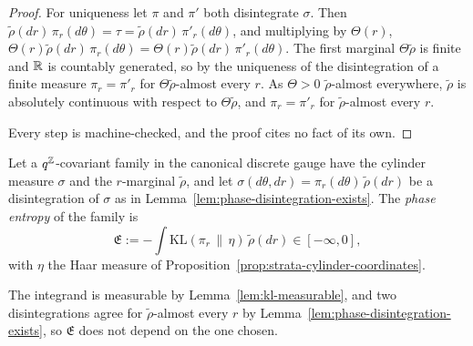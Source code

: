 \begin{proof}
For uniqueness let $\pi$ and $\pi'$ both disintegrate $\sigma$. Then
$\tilde\rho(dr)\,\pi_r(d\theta) = \tau = \tilde\rho(dr)\,\pi'_r(d\theta)$, and multiplying by $\Theta(r)$,
$\Theta(r)\tilde\rho(dr)\,\pi_r(d\theta) = \Theta(r)\tilde\rho(dr)\,\pi'_r(d\theta)$. The first marginal
$\Theta\tilde\rho$ is finite and $\mathbb{R}$ is countably generated, so by the uniqueness of the
disintegration of a finite measure $\pi_r = \pi'_r$ for $\Theta\tilde\rho$-almost every $r$. As $\Theta > 0$
$\tilde\rho$-almost everywhere, $\tilde\rho$ is absolutely continuous with respect to $\Theta\tilde\rho$,
and $\pi_r = \pi'_r$ for $\tilde\rho$-almost every $r$.

Every step is machine-checked, and the proof cites no fact of its own.
\end{proof}

\begin{definition}
\label{def:phase-entropy}
\leanok
{}
Let a $q^{\mathbb{Z}}$-covariant family in the canonical discrete gauge have the cylinder measure $\sigma$
and the $r$-marginal $\tilde\rho$, and let $\sigma(d\theta, dr) = \pi_r(d\theta)\,\tilde\rho(dr)$ be
a disintegration of $\sigma$ as in Lemma~\ref{lem:phase-disintegration-exists}. The
\emph{phase entropy} of the family is
\[
  \mathfrak{E} := -\int\mathrm{KL}(\pi_r \,\|\, \eta)\,\tilde\rho(dr) \in [-\infty, 0],
\]
with $\eta$ the Haar measure of Proposition~\ref{prop:strata-cylinder-coordinates}.
\statusT
\end{definition}

The integrand is measurable by Lemma~\ref{lem:kl-measurable}, and two disintegrations agree for
$\tilde\rho$-almost every $r$ by Lemma~\ref{lem:phase-disintegration-exists}, so $\mathfrak{E}$ does
not depend on the one chosen.

